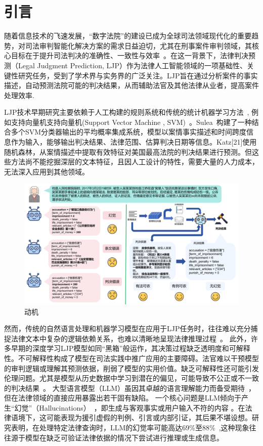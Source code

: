\section{\heiti 引言}

随着信息技术的飞速发展，“数字法院”的建设已成为全球司法领域现代化的重要趋势，对司法审判智能化解决方案的需求日益迫切，尤其在刑事案件审判领域，其核心目标在于提升司法判决的准确性、一致性与效率~\cite{aletras2016predicting}。在这一背景下，法律判决预测（Legal Judgment Prediction, LJP）作为法律人工智能领域的一项基础性、关键性研究任务，受到了学术界与实务界的广泛关注。LJP旨在通过分析案件的事实描述，自动预测法院可能的判决结果，从而辅助法官及其他法律从业者，提高案件处理效率.

LJP技术早期研究主要依赖于人工构建的规则系统和传统的统计机器学习方法~\cite{katz2017general,keown1980mathematical}, 例如支持向量机支持向量机(Support Vector  Machine , SVM)~\cite{boella2011using,kim2015legal}。Sulea~\cite{sulea2017exploring}构建了一种结合多个SVM分类器输出的平均概率集成系统，模型以案情事实描述和时间跨度信息作为输入，能够输出判决结果、法律范围、估算判决日期等信息。Katz[21]使用随机森林，从案情描述中提取有效特征对美国最高法院的判决结果进行预测。但这些方法尚不能挖掘深层的文本特征，且因人工设计的特性，需要大量的人力成本，无法深入应用到其他领域。
\begin{figure}[htbp]
	\centering
	\includegraphics[width=1\textwidth]{fig/motivation.pdf}
	\caption{动机}
	\label{fig:motivation}
\end{figure}
然而，传统的自然语言处理和机器学习模型在应用于LJP任务时，往往难以充分捕捉法律文本中复杂的逻辑依赖关系，也难以清晰地呈现法律推理过程~\cite{lin2012exploiting,liu2004case}。
此外，许多早期的深度学习LJP模型如同“黑箱”般运作，其决策过程缺乏透明度和可解释性。不可解释性构成了模型在司法实践中推广应用的主要障碍\cite{ling2017program,ma2021law,nye2021show}。法官难以干预模型的审判逻辑或理解其预测依据，削弱了模型的实用价值。缺乏可解释性还可能引发伦理问题。尤其是模型从历史数据中学习到潜在的偏见，可能导致不公正或不一致的判决结果~\cite{luo2017learning,lv2022improving}。
大型语言模型（LLM）虽因其卓越的语言理解能力而备受期待~\cite{jiang2023legal}，但在法律领域的直接应用暴露出若干固有缺陷。
一个核心问题是LLM倾向于产生“幻觉”（Hallucinations）~\cite{lewis2020retrieval,zheng2021when}，即生成与客观事实或用户输入不符的内容 。在法律语境下，这可能表现为援引虚假的判例、引言或内部引证，其后果不堪设想。研究表明，在处理特定法律查询时，LLM的幻觉率可能高达69\%至88\%~\cite{Dahl_2024},这种现象往往源于模型在缺乏可验证法律依据的情况下尝试进行推理或生成信息\cite{zhong2020iteratively,zhong2020jec-qa}。

